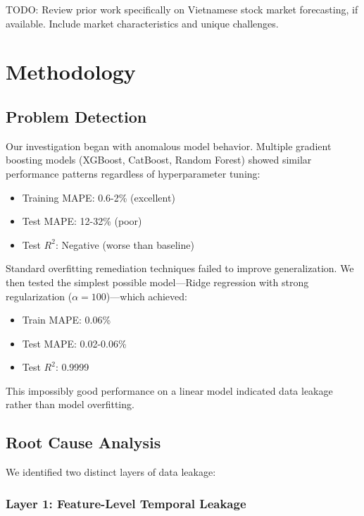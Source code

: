 \documentclass[conference]{IEEEtran}
\begin{document}
TODO: Review prior work specifically on Vietnamese stock market forecasting, if available. Include market characteristics and unique challenges.

\section{Methodology}

\subsection{Problem Detection}

Our investigation began with anomalous model behavior. Multiple gradient boosting models (XGBoost, CatBoost, Random Forest) showed similar performance patterns regardless of hyperparameter tuning:

\begin{itemize}
    \item Training MAPE: 0.6-2\% (excellent)
    \item Test MAPE: 12-32\% (poor)
    \item Test $R^2$: Negative (worse than baseline)
\end{itemize}

Standard overfitting remediation techniques failed to improve generalization. We then tested the simplest possible model—Ridge regression with strong regularization ($\alpha = 100$)—which achieved:

\begin{itemize}
    \item Train MAPE: 0.06\%
    \item Test MAPE: 0.02-0.06\%
    \item Test $R^2$: 0.9999
\end{itemize}

This impossibly good performance on a linear model indicated data leakage rather than model overfitting.

\subsection{Root Cause Analysis}

We identified two distinct layers of data leakage:

\subsubsection{Layer 1: Feature-Level Temporal Leakage}
\end{document}
